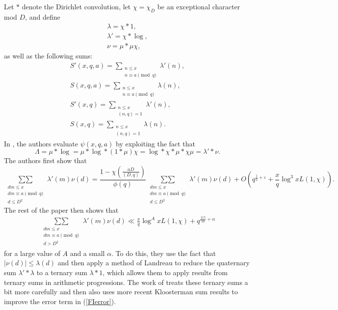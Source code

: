 \documentclass{amsart}
\begin{document}
Let $\ast$ denote the Dirichlet convolution, let $\chi=\chi_D$ be an exceptional character mod $D$, and define
\begin{gather*}
\lambda=\chi\ast 1,\\
\lambda'=\chi\ast \log,\\
\nu=\mu\ast\mu\chi,
\end{gather*}
as well as the following sums:
\begin{gather*}
S'(x,q,a)=\sum_{\substack{n\leq x \\n\equiv a \pmod q}}\lambda'(n),\\
S(x,q,a)=\sum_{\substack{n\leq x \\n\equiv a \pmod q}}\lambda(n),\\
S'(x,q)=\sum_{\substack{n\leq x \\(n,q)=1}}\lambda'(n),\\
S(x,q)=\sum_{\substack{n\leq x \\(n,q)=1}}\lambda(n).
\end{gather*}
In \cite{FI03}, the authors evaluate $\psi(x,q,a)$ by exploiting the fact that
$$\Lambda=\mu\ast \log =\mu\ast \log \ast (1\ast\mu)\chi=\log\ast \chi\ast \mu\ast\chi\mu=\lambda'\ast \nu.$$
The authors first show that
$$\mathop{\sum\sum}\limits_{\substack{dm\leq x \\ dm\equiv a\pmod q \\ d\leq D^2}}\lambda'(m)\nu(d)=\frac{1-\chi\left(\frac{aD}{(D,q)}\right)}{\phi(q)} \mathop{\sum\sum}\limits_{\substack{dm\leq x \\ dm\equiv a\pmod q \\ d\leq D^2}}\lambda'(m)\nu(d)+O\left(q^{\frac 12+\varepsilon}+\frac{x}{q}\log^3 xL(1,\chi)\right).$$
The rest of the paper then shows that
\begin{gather}\label{FIerror}\mathop{\sum\sum}\limits_{\substack{dm\leq x \\ dm\equiv a\pmod q \\ d>D^2}}\lambda'(m)\nu(d)\ll \frac xq\log^A xL(1,\chi)+q^{\frac{115}{58}+\alpha}\end{gather}
for a large value of $A$ and a small $\alpha$.  To do this, they use the fact that $|\nu(d)|\leq \lambda(d)$ and then apply a method of Landreau \cite{Land} to reduce the quaternary sum $\lambda'\ast \lambda$ to a ternary sum $\lambda\ast 1$, which allows them to apply results from ternary sums in arithmetic progressions.  The work of \cite{WrSiAP} treats these ternary sums a bit more carefully and then also uses more recent Kloosterman sum results to improve the error term in (\ref{FIerror}).
\end{document}
